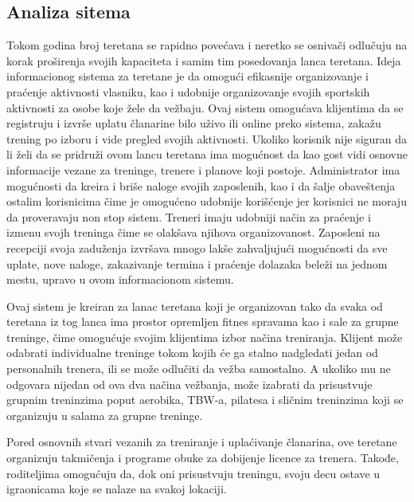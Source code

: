 \documentclass[../main.tex]{subfiles}
\begin{document}
\subsection{Analiza sitema}

Tokom godina broj teretana se rapidno povećava i neretko se osnivači odlučuju na korak proširenja svojih kapaciteta i samim tim posedovanja lanca teretana. Ideja informacionog sistema za teretane je da omogući efikasnije organizovanje i praćenje aktivnosti vlasniku, kao i udobnije organizovanje svojih sportskih aktivnosti za osobe koje žele da vežbaju. Ovaj sistem omogućava klijentima da se registruju i izvrše uplatu članarine bilo uživo ili online preko sistema, zakažu trening po izboru i vide pregled svojih aktivnosti. Ukoliko korisnik nije siguran da li želi da se pridruži ovom lancu teretana ima mogućnost da kao gost vidi osnovne informacije vezane za treninge, trenere i planove koji postoje. Administrator ima mogućnosti da kreira i briše naloge svojih zaposlenih, kao i da šalje obaveštenja ostalim korisnicima čime je omogućeno udobnije korišćenje jer korisnici ne moraju da proveravaju non stop sistem. Treneri imaju udobniji način za praćenje i izmenu svojh treninga čime se olakšava njihova organizovanost. Zaposleni na recepciji svoja zaduženja izvršava mnogo lakše zahvaljujući mogućnosti da sve uplate, nove naloge, zakazivanje termina i praćenje dolazaka beleži na jednom mestu, upravo u ovom informacionom sistemu.

Ovaj sistem je kreiran za lanac teretana koji je organizovan tako da svaka od teretana iz tog lanca ima prostor opremljen fitnes spravama kao i sale za grupne treninge, čime omogućuje svojim klijentima izbor načina treniranja. Klijent može odabrati individualne treninge tokom kojih će ga stalno nadgledati jedan od personalnih trenera, ili se može odlučiti da vežba samostalno. A ukoliko mu ne odgovara nijedan od ova dva načina vežbanja, može izabrati da prisustvuje grupnim treninzima poput aerobika, TBW-a, pilatesa i sličnim treninzima koji se organizuju u salama za grupne treninge. 

Pored osnovnih stvari vezanih za treniranje i uplaćivanje članarina, ove teretane organizuju takmičenja i programe obuke za dobijenje licence za trenera. Takođe, roditeljima omogućuju da, dok oni prisustvuju treningu, svoju decu ostave u igraonicama koje se nalaze na svakoj lokaciji.
\end{document}
